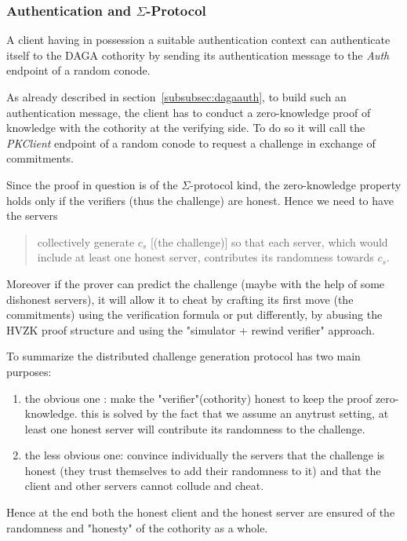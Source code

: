     \subsubsection{Authentication and \(\Sigma\)-Protocol}
    \label{subsubsec:sigmaprotocol}

    A client having in possession a suitable authentication context
    can authenticate itself to the DAGA cothority by sending its authentication message to the \emph{Auth} endpoint of a random conode.

    As already described in section~\ref{subsubsec:dagaauth}, to build such an authentication message, the client
    has to conduct a zero-knowledge proof of knowledge with the cothority at the verifying side.
    To do so it will call the \emph{PKClient} endpoint of a random conode to request a challenge in exchange of commitments.

    Since the proof in question is of the \(\Sigma\)-protocol kind, the zero-knowledge property holds only if the verifiers (thus the challenge) are honest.
    Hence we need to have the servers \blockquote{
    collectively generate \(c_s\) [(the challenge)] so that each server, which would include at least
    one honest server, contributes its randomness towards \(c_s\).
    }\cite{syta_identity_2015}
    Moreover if the prover can predict the challenge (maybe with the help of some dishonest servers),
    it will allow it to cheat by crafting its first move (the commitments) using the verification formula
    or put differently, by abusing the HVZK proof structure and using the "simulator + rewind verifier" approach.

    \noindent
    To summarize the distributed challenge generation protocol has two main purposes:
    \begin{enumerate}
        \item the obvious one : make the "verifier"(cothority) honest to keep the proof zero-knowledge.
        this is solved by the fact that we assume an anytrust setting, at least one honest server will contribute its randomness to the challenge.
        \item the less obvious one: convince individually the servers that the challenge is honest
        (they trust themselves to add their randomness to it) and that the client and other servers cannot collude and cheat.
    \end{enumerate}
    Hence at the end both the honest client and the honest server are ensured of the randomness and "honesty" of the cothority as a whole.

